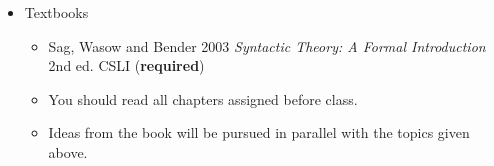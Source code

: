 \documentclass[a4paper,landscape,headrule,footrule]{foils}
\begin{document}
%



\begin{itemize}
\item Textbooks
  \begin{itemize}
  \item Sag, Wasow and Bender 2003 \textit{Syntactic Theory: A Formal Introduction} 2nd ed. CSLI (\textbf{required})
  \end{itemize}
  \begin{itemize}
  \item You should read all chapters assigned before class.
  \item Ideas from the book will be pursued in parallel with the
    topics given above.
  \end{itemize}
\end{itemize}








\end{document}
